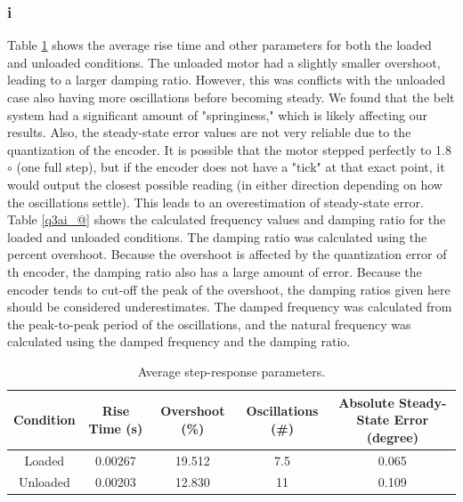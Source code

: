 \documentclass{article}
\theoremstyle{plain}
\theoremstyle{definition}
\theoremstyle{remark}
\begin{document}
\subsubsection*{i}
Table \ref{q3ai_!} shows the average rise time and other parameters for both the loaded and unloaded conditions. The unloaded motor had a slightly smaller overshoot, leading to a larger damping ratio. However, this was conflicts with the unloaded case also having more oscillations before becoming steady. We found that the belt system had a significant amount of "springiness," which is likely affecting our results. Also, the steady-state error values are not very reliable due to the quantization of the encoder. It is possible that the motor stepped perfectly to 1.8$\circ$ (one full step), but if the encoder does not have a "tick" at that exact point, it would output the closest possible reading (in either direction depending on how the oscillations settle). This leads to an overestimation of steady-state error. \\

Table \ref{q3ai_@} shows the calculated frequency values and damping ratio for the loaded and unloaded conditions. The damping ratio was calculated using the percent overshoot. Because the overshoot is affected by the quantization error of th encoder, the damping ratio also has a large amount of error. Because the encoder tends to cut-off the peak of the overshoot, the damping ratios given here should be considered underestimates. The damped frequency was calculated from the peak-to-peak period of the oscillations, and the natural frequency was calculated using the damped frequency and the damping ratio.\\


\begin{table}[htb]
\begin{center}
    \begin{tabular}{|c|c|c|c|c|}
        \hline
        Condition & Rise Time (s)  & Overshoot (\%) & Oscillations (\#) &  Absolute Steady-State Error (degree)   \\ \hline
        Loaded   & 0.00267    & 19.512 & 7.5 &   0.065 \\ 
        Unloaded   & 0.00203    & 12.830 & 11 & 0.109         \\         
        \hline
    \end{tabular}
\caption{Average step-response parameters.}
\label{q3ai_!}
\end{center}
\end{table}
\end{document}
